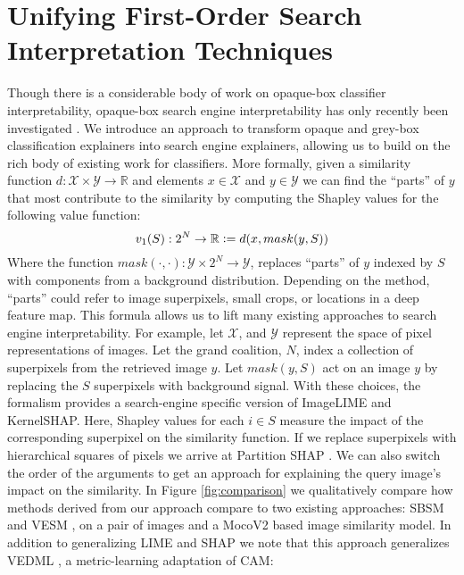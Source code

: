 \documentclass{article} %
\newcommand{\defeq}{\vcentcolon=}
\begin{document}
\section{Unifying First-Order Search Interpretation Techniques}
\vspace{-.1in}
\label{sec:cam}
Though there is a considerable body of work on opaque-box classifier interpretability, opaque-box search engine interpretability has only recently been investigated \citep{singh2019exs,vedml,vesm}. We introduce an approach to transform opaque and grey-box classification explainers into search engine explainers, allowing us to build on the rich body of existing work for classifiers. More formally, given a similarity function $d: \mathcal{X} \times \mathcal{Y} \to \mathbb{R}$ and elements $x \in \mathcal{X}$ and $y \in \mathcal{Y}$ we can find the ``parts'' of $y$ that most contribute to the similarity by computing the Shapley values for the following value function:
\begin{equation}
    \label{eq:first-order}
    v_{1}(S): 2^N \to \mathbb{R} \defeq d(x, mask(y, S))
\end{equation}
Where the function $mask(\cdot, \cdot): \mathcal{Y} \times 2^N \to  \mathcal{Y}$, replaces ``parts'' of $y$ indexed by $S$ with components from a background distribution. Depending on the method, ``parts'' could refer to image superpixels, small crops, or locations in a deep feature map. This formula allows us to lift many existing approaches to search engine interpretability. For example, let $\mathcal{X}$, and $\mathcal{Y}$ represent the space of pixel representations of images. Let the grand coalition, $N$, index a collection of superpixels from the retrieved image $y$. Let $mask(y, S)$ act on an image $y$ by replacing the $S$ superpixels with background signal. With these choices, the formalism provides a search-engine specific version of ImageLIME and KernelSHAP. Here, Shapley values for each $i \in S$ measure the impact of the corresponding superpixel on the similarity function. If we replace superpixels with hierarchical squares of pixels we arrive at Partition SHAP \citep{partition-shap}. We can also switch the order of the arguments to get an approach for explaining the query image's impact on the similarity. In Figure \ref{fig:comparison} we qualitatively compare how methods derived from our approach compare to two existing approaches: SBSM \citep{sbsm} and VESM \citep{vesm}, on a pair of images and a MocoV2 based image similarity model. In addition to generalizing LIME and SHAP we note that this approach generalizes VEDML \citep{vedml}, a metric-learning adaptation of CAM:
\end{document}
